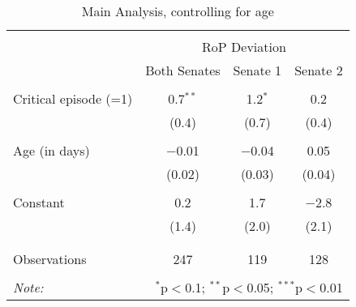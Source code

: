 
\begin{table}[!htbp] \centering 
  \caption{Main Analysis, controlling for age} 
  \label{} 
\begin{tabular}{@{\extracolsep{5pt}}lccc} 
\\[-1.8ex]\hline 
\hline \\[-1.8ex] 
 & \multicolumn{3}{c}{RoP Deviation} \\ 
\cline{2-4} 
 & Both Senates & Senate 1 & Senate 2 \\ 
\hline \\[-1.8ex] 
 Critical episode (=1) & 0.7$^{**}$ & 1.2$^{*}$ & 0.2 \\ 
  & (0.4) & (0.7) & (0.4) \\ 
  & & & \\ 
 Age (in days) & $-$0.01 & $-$0.04 & 0.05 \\ 
  & (0.02) & (0.03) & (0.04) \\ 
  & & & \\ 
 Constant & 0.2 & 1.7 & $-$2.8 \\ 
  & (1.4) & (2.0) & (2.1) \\ 
  & & & \\ 
\hline \\[-1.8ex] 
Observations & 247 & 119 & 128 \\ 
\hline 
\hline \\[-1.8ex] 
\textit{Note:}  & \multicolumn{3}{r}{$^{*}$p$<$0.1; $^{**}$p$<$0.05; $^{***}$p$<$0.01} \\ 
\end{tabular} 
\end{table} 
